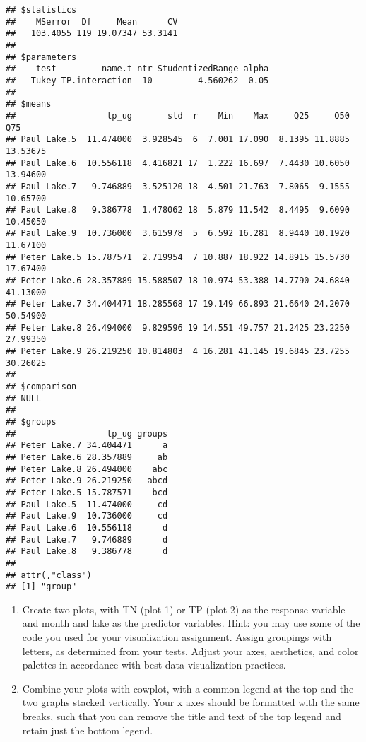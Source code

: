 \documentclass[
]{article}
\begin{document}
\begin{verbatim}
## $statistics
##    MSerror  Df     Mean      CV
##   103.4055 119 19.07347 53.3141
## 
## $parameters
##    test         name.t ntr StudentizedRange alpha
##   Tukey TP.interaction  10         4.560262  0.05
## 
## $means
##                  tp_ug       std  r    Min    Max     Q25     Q50      Q75
## Paul Lake.5  11.474000  3.928545  6  7.001 17.090  8.1395 11.8885 13.53675
## Paul Lake.6  10.556118  4.416821 17  1.222 16.697  7.4430 10.6050 13.94600
## Paul Lake.7   9.746889  3.525120 18  4.501 21.763  7.8065  9.1555 10.65700
## Paul Lake.8   9.386778  1.478062 18  5.879 11.542  8.4495  9.6090 10.45050
## Paul Lake.9  10.736000  3.615978  5  6.592 16.281  8.9440 10.1920 11.67100
## Peter Lake.5 15.787571  2.719954  7 10.887 18.922 14.8915 15.5730 17.67400
## Peter Lake.6 28.357889 15.588507 18 10.974 53.388 14.7790 24.6840 41.13000
## Peter Lake.7 34.404471 18.285568 17 19.149 66.893 21.6640 24.2070 50.54900
## Peter Lake.8 26.494000  9.829596 19 14.551 49.757 21.2425 23.2250 27.99350
## Peter Lake.9 26.219250 10.814803  4 16.281 41.145 19.6845 23.7255 30.26025
## 
## $comparison
## NULL
## 
## $groups
##                  tp_ug groups
## Peter Lake.7 34.404471      a
## Peter Lake.6 28.357889     ab
## Peter Lake.8 26.494000    abc
## Peter Lake.9 26.219250   abcd
## Peter Lake.5 15.787571    bcd
## Paul Lake.5  11.474000     cd
## Paul Lake.9  10.736000     cd
## Paul Lake.6  10.556118      d
## Paul Lake.7   9.746889      d
## Paul Lake.8   9.386778      d
## 
## attr(,"class")
## [1] "group"
\end{verbatim}

\begin{enumerate}
\def\labelenumi{\arabic{enumi}.}
\setcounter{enumi}{6}
\item
  Create two plots, with TN (plot 1) or TP (plot 2) as the response
  variable and month and lake as the predictor variables. Hint: you may
  use some of the code you used for your visualization assignment.
  Assign groupings with letters, as determined from your tests. Adjust
  your axes, aesthetics, and color palettes in accordance with best data
  visualization practices.
\item
  Combine your plots with cowplot, with a common legend at the top and
  the two graphs stacked vertically. Your x axes should be formatted
  with the same breaks, such that you can remove the title and text of
  the top legend and retain just the bottom legend.
\end{enumerate}
\end{document}
